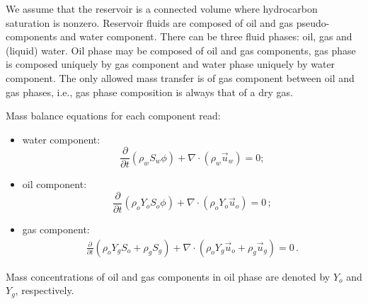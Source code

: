 \documentclass[authoryear,preprint,review,11pt]{elsarticle}
\begin{document}

We assume that the reservoir is a connected volume where hydrocarbon saturation is nonzero. Reservoir fluids are composed of oil and gas pseudo-components and water component. There can be three fluid phases: oil, gas and (liquid) water. Oil phase may be composed of oil and gas components, gas phase is composed uniquely by gas component and water phase uniquely by water component. The only allowed mass transfer is of gas component between oil and gas phases, i.e., gas phase composition is always that of a dry gas.


Mass balance equations for each component read:

\begin{itemize}
\item water component:
\begin{equation}\label{eq: Sw1}
\frac{\partial}{\partial t} \left( \rho_w S_w \phi \right) +\nabla \cdot \left( \rho_w \vec{u}_w \right) = 0 ;
\end{equation}

\item oil component:
\begin{equation}\label{eq: So1}
\frac{\partial}{\partial t}\left( \rho_o Y_o S_o \phi \right) + \nabla \cdot \left( \rho_o Y_o \vec{u}_o \right) = 0 \, ;
\end{equation}

\item gas component:
\begin{equation}\label{eq: Sg1}
\begin{split}
\frac{\partial}{\partial t} \left( \rho_o Y_g S_o + \rho_g S_g\right) + \nabla  \cdot \left( \rho_o Y_g \vec{u}_o + \rho_g \vec{u}_g\right) = 0\, .
\end{split}
\end{equation}
\end{itemize}
Mass concentrations of oil and gas components in oil phase are denoted by $Y_o$ and $Y_g$, respectively. 
\end{document}
